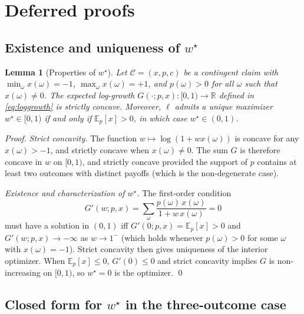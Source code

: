 \documentclass[11pt]{article}
\newtheorem{lemma}[theorem]{Lemma}
\theoremstyle{definition}
\theoremstyle{remark}
\newcommand{\E}{\mathbb{E}}
\newcommand{\R}{\mathbb{R}}
\newcommand{\C}{\mathcal{C}}
\begin{document}
\appendix

\section{Deferred proofs}\label{app:proofs}

\subsection{Existence and uniqueness of \texorpdfstring{$w^\star$}{w-star}}

\begin{lemma}[Properties of $w^\star$]\label{lem:wstar}
Let $\C = (x, p, c)$ be a contingent claim with
$\min_\omega x(\omega) = -1$, $\max_\omega x(\omega) = +1$, and
$p(\omega) > 0$ for all $\omega$ such that $x(\omega) \neq 0$. The
expected log-growth $G(\cdot; p, x): [0, 1) \to \R$ defined in
\eqref{eq:loggrowth} is strictly concave. Moreover, $\ell$ admits a unique
maximizer $w^\star \in [0, 1)$ if and only if
$\E_p[x] > 0$, in which case $w^\star \in (0, 1)$.
\end{lemma}

\begin{proof}
\emph{Strict concavity.} The function $w \mapsto \log(1 + w x(\omega))$
is concave for any $x(\omega) > -1$, and strictly concave when
$x(\omega) \neq 0$. The sum $G$ is therefore concave in $w$ on
$[0, 1)$, and strictly concave provided the support of $p$ contains at
least two outcomes with distinct payoffs (which is the non-degenerate
case).

\emph{Existence and characterization of $w^\star$.} The first-order
condition
\begin{equation*}
G'(w; p, x) = \sum_\omega \frac{p(\omega) \, x(\omega)}{1 + w \, x(\omega)} = 0
\end{equation*}
must have a solution in $(0, 1)$ iff $G'(0; p, x) = \E_p[x] > 0$ and
$G'(w; p, x) \to -\infty$ as $w \to 1^-$ (which holds whenever
$p(\omega) > 0$ for some $\omega$ with $x(\omega) = -1$). Strict
concavity then gives uniqueness of the interior optimizer. When
$\E_p[x] \le 0$, $G'(0) \le 0$ and strict concavity implies $G$ is
non-increasing on $[0, 1)$, so $w^\star = 0$ is the optimizer.
\qed
\end{proof}

\subsection{Closed form for \texorpdfstring{$w^\star$}{w-star} in the three-outcome case}
\end{document}
